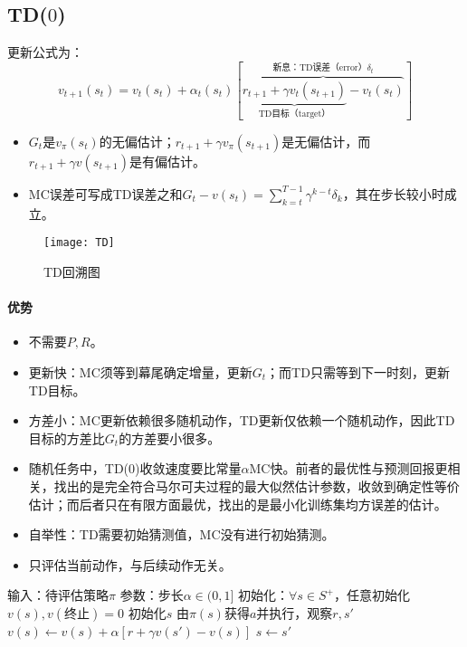 \documentclass[
12pt, %
a4paper, 
oneside, %
headinclude,footinclude, %
]{scrartcl}
\begin{document}
\subsection[TD($ 0 $)]{TD($ 0 $)}
更新公式为：
$$ v_{t + 1}(s_t) = v_t(s_t) + \alpha_t(s_t)[\overbrace{\underbrace{r_{t + 1} + \gamma v_t(s_{t + 1})}_{\text{TD目标（target）}} - v_t(s_t)}^{\text{新息：TD误差（error）}\delta_t}] $$

\begin{itemize}
\item $ G_t $是$ v_{\pi}(s_t) $的无偏估计；$ r_{t + 1} + \gamma v_{\pi}(s_{t + 1}) $是无偏估计，而$ r_{t + 1} + \gamma v(s_{t + 1}) $是有偏估计。
\item MC误差可写成TD误差之和$ G_t - v(s_t) = \sum_{k = t}^{T - 1} \gamma^{k - t} \delta_k $，其在步长较小时成立。
\end{itemize}

\begin{figure}[H]
\centering
\texttt{[image: TD]}
\caption{TD回溯图}
\end{figure}
\paragraph{优势}
\begin{itemize}
\item 不需要$ P,R $。
\item 更新快：MC须等到幕尾确定增量，更新$ G_t $；而TD只需等到下一时刻，更新TD目标。
\item 方差小：MC更新依赖很多随机动作，TD更新仅依赖一个随机动作，因此TD目标的方差比$ G_t $的方差要小很多。
\item 随机任务中，TD($ 0 $)收敛速度要比常量$ \alpha $MC快。前者的最优性与预测回报更相关，找出的是完全符合马尔可夫过程的最大似然估计参数，收敛到确定性等价估计；而后者只在有限方面最优，找出的是最小化训练集均方误差的估计。
\item 自举性：TD需要初始猜测值，MC没有进行初始猜测。
\item 只评估当前动作，与后续动作无关。
\end{itemize}
\begin{myalgorithm}[TD($ 0 $)]
\State 输入：待评估策略$ \pi $
\State 参数：步长$ \alpha \in (0, 1] $
\State 初始化：$ \forall s \in S^+ $，任意初始化$ v(s), v(\text{终止}) = 0 $
\State 初始化$ s $
\State 由$ \pi(s) $获得$ a $并执行，观察$ r, s' $
\State $ v(s) \gets v(s) + \alpha[r + \gamma v(s') - v(s)] $
\State $ s \gets s' $
\EndWhile
\EndFor
\end{myalgorithm}
\end{document}
